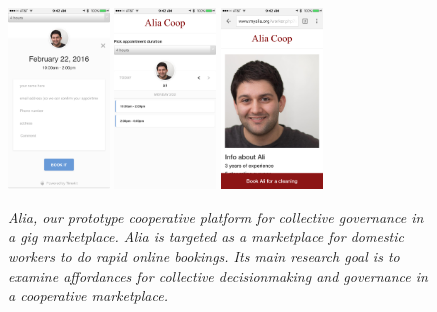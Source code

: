 \documentclass[11pt]{article}
\begin{document}
\begin{figure}
  \caption{\textit{Alia, our prototype cooperative platform for collective governance in a gig marketplace.
  Alia is targeted as a marketplace for domestic workers to do rapid online bookings.
  Its main research goal is to examine affordances for collective decisionmaking and governance in a cooperative marketplace.}}
    \includegraphics[width=0.24\textwidth]{figures/1.png}
    \includegraphics[width=0.24\textwidth]{figures/2.png}
    \includegraphics[width=0.24\textwidth]{figures/3.png}
\end{figure}
\end{document}
